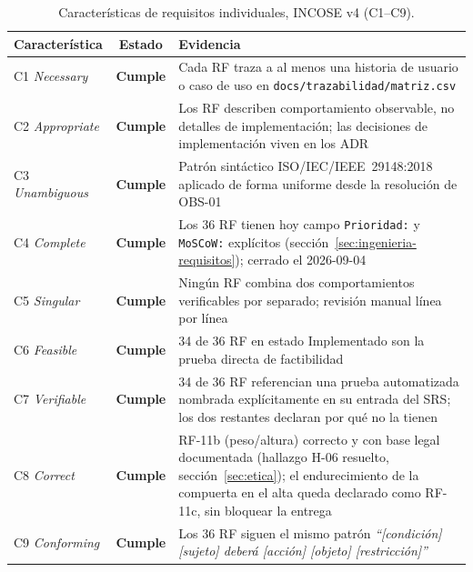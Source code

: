 \documentclass[11pt,a4paper]{article}
\newcommand{\ruta}[1]{\texttt{\footnotesize #1}}
\newcommand{\cumple}{\textcolor{okverde}{\textbf{Cumple}}}
\begin{document}
\begin{table}[htbp]
\centering
\scriptsize
\caption{Características de requisitos individuales, INCOSE v4 (C1--C9).}
\label{tab:incose-individual}
\begin{tabular}{@{}p{3.6cm}cp{8.5cm}@{}}
\toprule
\textbf{Característica} & \textbf{Estado} & \textbf{Evidencia} \\
\midrule
C1 \emph{Necessary} & \cumple & Cada RF traza a al menos una historia de usuario o caso de uso en \ruta{docs/trazabilidad/matriz.csv} \\
C2 \emph{Appropriate} & \cumple & Los RF describen comportamiento observable, no detalles de implementación; las decisiones de implementación viven en los ADR \\
C3 \emph{Unambiguous} & \cumple & Patrón sintáctico ISO/IEC/IEEE~29148:2018 aplicado de forma uniforme desde la resolución de OBS-01 \\
C4 \emph{Complete} & \cumple & Los 36 RF tienen hoy campo \texttt{Prioridad:} y \texttt{MoSCoW:} explícitos (sección~\ref{sec:ingenieria-requisitos}); cerrado el 2026-09-04 \\
C5 \emph{Singular} & \cumple & Ningún RF combina dos comportamientos verificables por separado; revisión manual línea por línea \\
C6 \emph{Feasible} & \cumple & 34 de 36 RF en estado Implementado son la prueba directa de factibilidad \\
C7 \emph{Verifiable} & \cumple & 34 de 36 RF referencian una prueba automatizada nombrada explícitamente en su entrada del SRS; los dos restantes declaran por qué no la tienen \\
C8 \emph{Correct} & \cumple & RF-11b (peso/altura) correcto y con base legal documentada (hallazgo H-06 resuelto, sección~\ref{sec:etica}); el endurecimiento de la compuerta en el alta queda declarado como RF-11c, sin bloquear la entrega \\
C9 \emph{Conforming} & \cumple & Los 36 RF siguen el mismo patrón \emph{``[condición] [sujeto] deberá [acción] [objeto] [restricción]''} \\
\bottomrule
\end{tabular}
\end{table}
\end{document}
